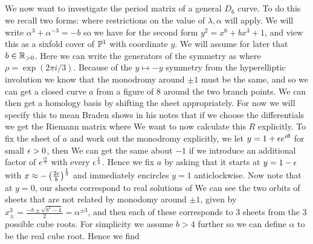 \documentclass{article}
\begin{document}
\subsection{}
We now want to investigate the period matrix of a general $D_6$ curve. To do this we recall two forms:
where restrictions on the value of $\lambda,\alpha$ will apply. We will write $\alpha^3 + \alpha^{-3} = -b$ so we have for the second form $y^2 = x^6+bx^3+1$, and view this as a sixfold cover of $\mathbb{P}^1$ with coordinate $y$. We will assume for later that $b\in\mathbb{R}_{>0}$. Here we can write the generators of the symmetry as 
where $\rho = \exp(2\pi i/3)$. Because of the $y \mapsto -y$ symmetry from the hyperelliptic involution we know that the monodromy around $\pm 1$ must be the same, and so we can get a closed curve $a$ from a figure of 8 around the two branch points. We can then get a homology basis by shifting the sheet appropriately. For now we will specify this to mean 
Braden shows in his notes that if we choose the differentials 
we get the Riemann matrix 
where 
We want to now calculate this $R$ explicitly. To fix the sheet of $a$ and work out the monodromy explicitly, we let $y=1+\epsilon e^{i\theta}$ for small $\epsilon >0$, then 
We can get the same about $-1$ if we introduce an additional factor of $e^\frac{i\pi}{3}$ with every $\epsilon^\frac{1}{3}$. Hence we fix $a$ by asking that it starts at $y=1-\epsilon$ with $x\approx -\left( \frac{2\epsilon}{b} \right)^{\frac{1}{3}}$ and immediately encircles $y=1$ anticlockwise. Now note that at $y=0$, our sheets correspond to real solutions of 
We can see the two orbits of sheets that are not related by monodomy around $\pm 1$, given by $x_\pm^3 = \frac{-b \pm \sqrt{b^2-4}}{2} = \alpha^{\pm3}$, and then each of these corresponds to 3 sheets from the 3 possible cube roots. For simplicity we assume $b>4$ further so we can define $\alpha$ to be the real cube root. Hence we find
\end{document}

